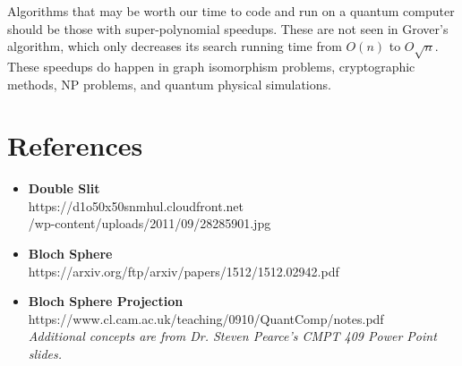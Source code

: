 \documentclass[letterpaper, 10 pt, conference]{ieeeconf}
\begin{document}
Algorithms that may be worth our time to code and run on a quantum computer should be those with super-polynomial speedups.  These are not seen in Grover’s algorithm, which only decreases its search running time from \(O(n)\) to \(O\sqrt{n}\).  These speedups do happen in graph isomorphism problems, cryptographic methods, NP problems, and quantum physical simulations.

\section{References}

\begin{itemize}
\item \textbf{Double Slit}\\ https://d1o50x50snmhul.cloudfront.net \\ /wp-content/uploads/2011/09/28285901.jpg\\

\item \textbf{Bloch Sphere}\\
https://arxiv.org/ftp/arxiv/papers/1512/1512.02942.pdf\\

\item \textbf{Bloch Sphere Projection}\\ https://www.cl.cam.ac.uk/teaching/0910/QuantComp/notes.pdf\\

\textit{Additional concepts are from Dr. Steven Pearce's CMPT 409 Power Point slides.}
\end{itemize}
\end{document}
